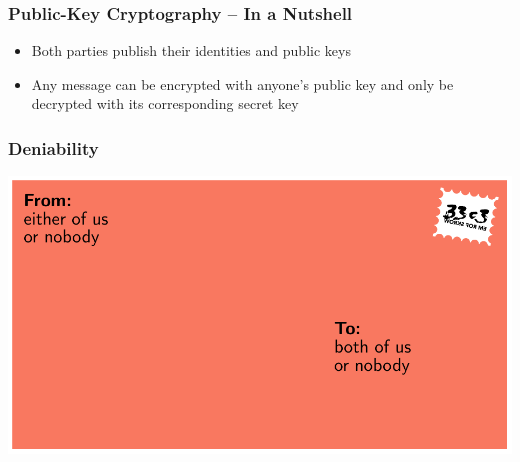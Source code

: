 \documentclass[
	aspectratio=169,
	xetex,
]{beamer}
\begin{document}
\begin{frame}
	\frametitle{Public-Key Cryptography -- In a Nutshell}
	\vspace{3mm}
	\begin{minipage}[t][.65\textheight]{\textwidth}
		\begin{center}
		\end{center}
	\end{minipage}

	\begin{itemize}
		\item Both parties publish their identities and public keys
		\item Any message can be encrypted with anyone's public key and only be decrypted with its corresponding secret key
	\end{itemize}

\end{frame}

\begin{frame}
	\frametitle{Deniability}
	\centering
	\includegraphics[width=.8\textwidth]{img/deniability-letter.pdf}
\end{frame}
\end{document}
